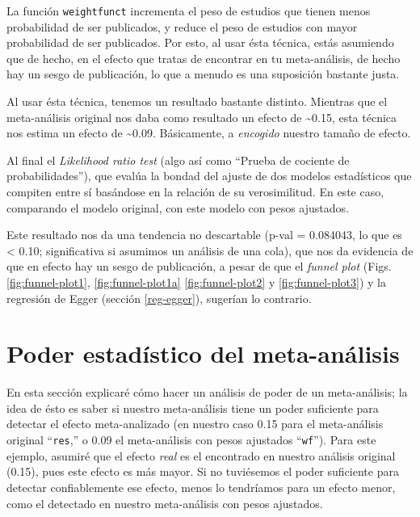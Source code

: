 \documentclass[
  bookmarksnumbered]{article}
\begin{document}
La función \texttt{weightfunct} incrementa el peso de estudios que tienen menos probabilidad de ser publicados, y reduce el peso de estudios con mayor probabilidad de ser publicados. Por esto, al usar ésta técnica, estás asumiendo que de hecho, en el efecto que tratas de encontrar en tu meta-análisis, de hecho hay un sesgo de publicación, lo que a menudo es una suposición bastante justa.

Al usar ésta técnica, tenemos un resultado bastante distinto. Mientras que el meta-análisis original nos daba como resultado un efecto de \textasciitilde0.15, esta técnica nos estima un efecto de \textasciitilde0.09. Básicamente, a \emph{encogido} nuestro tamaño de efecto.

Al final el \emph{Likelihood ratio test} (algo así como ``Prueba de cociente de probabilidades''), que evalúa la bondad del ajuste de dos modelos estadísticos que compiten entre sí basándose en la relación de su verosimilitud. En este caso, comparando el modelo original, con este modelo con pesos ajustados.

Este resultado nos da una tendencia no descartable (p-val = 0.084043, lo que es \textless{} 0.10; significativa si asumimos un análisis de una cola), que nos da evidencia de que en efecto hay un sesgo de publicación, a pesar de que el \emph{funnel plot} (Figs. \ref{fig:funnel-plot1}, \ref{fig:funnel-plot1a} \ref{fig:funnel-plot2} y \ref{fig:funnel-plot3}) y la regresión de Egger (sección \ref{reg-egger}), sugerían lo contrario.

\hypertarget{poder-estaduxedstico-del-meta-anuxe1lisis}{%
\section{Poder estadístico del meta-análisis}\label{poder-estaduxedstico-del-meta-anuxe1lisis}}

En esta sección explicaré cómo hacer un análisis de poder de un meta-análisis; la idea de ésto es saber si nuestro meta-análisis tiene un poder suficiente para detectar el efecto meta-analizado (en nuestro caso 0.15 para el meta-análisis original ``\texttt{res},'' o 0.09 el meta-análisis con pesos ajustados ``\texttt{wf}''). Para este ejemplo, asumiré que el efecto \emph{real} es el encontrado en nuestro análisis original (0.15), pues este efecto es más mayor. Si no tuviésemos el poder suficiente para detectar confiablemente ese efecto, menos lo tendríamos para un efecto menor, como el detectado en nuestro meta-análisis con pesos ajustados.
\end{document}
